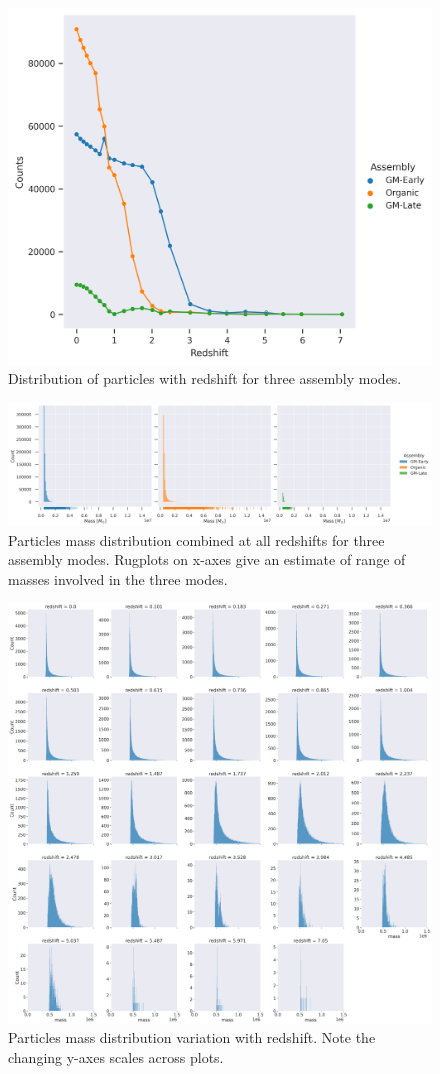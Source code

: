 \documentclass{article}
\begin{document}
	
	\begin{figure}
			\centering 
			\includegraphics[width=.5\columnwidth]{../plots/particle_distribution_wrt_redshift.png}
			\caption{Distribution of particles with redshift for three assembly modes.}
	\end{figure}

	\begin{figure}
			\centering 
			\includegraphics[width=\columnwidth]{../plots/particle_mass_distribution.png}
			\caption{Particles mass distribution combined at all redshifts for three assembly modes. Rugplots on x-axes give an estimate of range of masses involved in the three modes.}
	\end{figure}

	\clearpage

	\begin{figure}
			\centering 
			\includegraphics[width=.9\columnwidth]{../plots/mass_distribution_wrt_redshift_GM-Early.png}
			\caption{Particles mass distribution variation with redshift. Note the changing y-axes scales across plots.}
	\end{figure}
\end{document}

